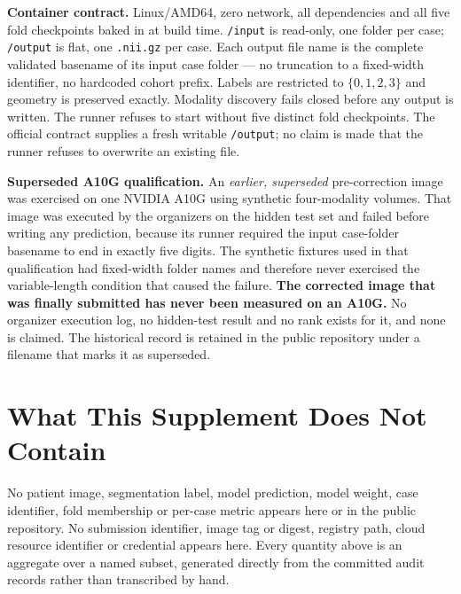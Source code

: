 \documentclass[runningheads]{llncs}
\begin{document}
\medskip\noindent\textbf{Container contract.} Linux/AMD64, zero network, all dependencies and all
five fold checkpoints baked in at build time. \texttt{/input} is read-only, one folder per case;
\texttt{/output} is flat, one \texttt{.nii.gz} per case. Each output file name is the complete
validated basename of its input case folder --- no truncation to a fixed-width identifier, no
hardcoded cohort prefix. Labels are restricted to $\{0,1,2,3\}$ and geometry is preserved exactly.
Modality discovery fails closed before any output is written. The runner refuses to start without
five distinct fold checkpoints. The official contract supplies a fresh writable \texttt{/output}; no
claim is made that the runner refuses to overwrite an existing file.

\medskip\noindent\textbf{Superseded A10G qualification.} An \emph{earlier, superseded}
pre-correction image was exercised on one NVIDIA A10G using synthetic four-modality volumes. That
image was executed by the organizers on the hidden test set and failed before writing any
prediction, because its runner required the input case-folder basename to end in exactly five
digits. The synthetic fixtures used in that qualification had fixed-width folder names and therefore
never exercised the variable-length condition that caused the failure. \textbf{The corrected image
that was finally submitted has never been measured on an A10G.} No organizer execution log, no
hidden-test result and no rank exists for it, and none is claimed. The historical record is retained
in the public repository under a filename that marks it as superseded.


\section{What This Supplement Does Not Contain}

No patient image, segmentation label, model prediction, model weight, case identifier, fold
membership or per-case metric appears here or in the public repository. No submission identifier,
image tag or digest, registry path, cloud resource identifier or credential appears here. Every
quantity above is an aggregate over a named subset, generated directly from the committed audit
records rather than transcribed by hand.
\end{document}
